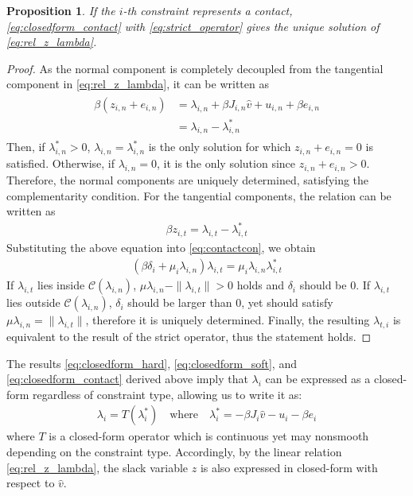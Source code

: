 \documentclass[lettersize,journal]{IEEEtran}
\newtheorem{proposition}{Proposition}
\begin{document}
\begin{proposition} \label{prop:strict_scc}
If the $i$-th constraint represents a contact, \eqref{eq:closedform_contact} with \eqref{eq:strict_operator} gives the unique solution of \eqref{eq:rel_z_lambda}.
\end{proposition}
\begin{proof}
As the normal component is completely decoupled from the tangential component in \eqref{eq:rel_z_lambda}, it can be written as 
\begin{align*}
\begin{split}
    \beta (z_{i,n} + e_{i,n}) &= \lambda_{i,n} + \beta J_{i,n}\hat{v} + u_{i,n} + \beta e_{i,n} \\   
    &= \lambda_{i,n} - \lambda_{i,n}^*
\end{split}
\end{align*}
Then, if $\lambda_{i,n}^{*}>0$, $\lambda_{i,n}=\lambda_{i,n}^{*}$ is the only solution for which $z_{i,n}+e_{i,n}=0$ is satisfied. 
Otherwise, if $\lambda_{i,n}=0$, it is the only solution since $z_{i,n}+e_{i,n}>0$.
Therefore, the normal components are uniquely determined, satisfying the complementarity condition.
For the tangential components, the relation can be written as
\begin{align*}
    \beta z_{i,t} = \lambda_{i,t} - \lambda_{i,t}^*
\end{align*}
Substituting the above equation into \eqref{eq:contactcon}, we obtain
\begin{align*}
    (\beta\delta_i + \mu_i\lambda_{i,n})\lambda_{i,t} = \mu_i\lambda_{i,n}\lambda_{i,t}^*
\end{align*} 
If $\lambda_{i,t}$ lies inside $\mathcal{C}(\lambda_{i,n})$, $\mu\lambda_{i,n}-\|\lambda_{i,t}\|>0$ holds and $\delta_i$ should be $0$.
If $\lambda_{i,t}$ lies outside $\mathcal{C}(\lambda_{i,n})$, $\delta_i$ should be larger than $0$, yet should satisfy $\mu\lambda_{i,n}=\|\lambda_{i,t}\|$, therefore it is uniquely determined.
Finally, the resulting $\lambda_{t,i}$ is equivalent to the result of the strict operator, thus the statement holds.
\end{proof}


The results \eqref{eq:closedform_hard}, \eqref{eq:closedform_soft}, and \eqref{eq:closedform_contact} derived above imply that $\lambda_i$ can be expressed as a closed-form regardless of constraint type, allowing us to write it as:
\begin{align} \label{eq:closedform_operator}
\lambda_i = T(\lambda_i^*) \quad \text{where} \quad \lambda_i^* = -\beta J_i\hat{v}-u_i -\beta e_i
\end{align}
where $T$ is a closed-form operator which is continuous yet may nonsmooth depending on the constraint type.
Accordingly, by the linear relation \eqref{eq:rel_z_lambda}, the slack variable $z$ is also expressed in closed-form with respect to $\hat{v}$.
\end{document}
